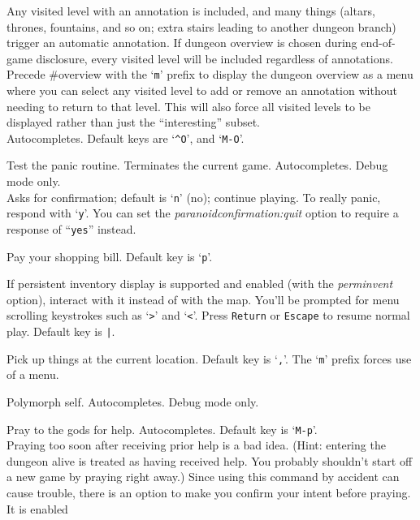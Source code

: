 \documentclass[titlepage]{article}
\begin{document}
\begin{description}[font=\mdseries\ttfamily]
Any visited level
with an annotation is included,
and many things (altars, thrones, fountains, and so on; extra stairs
leading to another dungeon branch) trigger an automatic annotation.
If dungeon overview is chosen during end-of-game disclosure, every visited
level will be included regardless of annotations.
\\
Precede \#overview with the `\texttt{m}' prefix to display the dungeon
overview as a menu where you can select any visited level to add or
remove an annotation without needing to return to that level.
This will also force all visited levels to be displayed rather than just
the ``interesting'' subset.
\\
Autocompletes.
Default keys are `\texttt{\textasciicircum O}', and `\texttt{M-O}'.
\item[\#panic]
Test the panic routine.
Terminates the current game.
Autocompletes.
Debug mode only.\\
Asks for confirmation; default is `\texttt{n}' (no); continue playing.
To really panic, respond with `\texttt{y}'.
You can set the
\textit{paranoid\textunderscore confirmation:quit}
option to require a response of ``\texttt{yes}'' instead.
\item[\#pay]
Pay your shopping bill. Default key is `\texttt{p}'.
\item[\#perminv]
If persistent inventory display is supported and enabled (with the
\textit{perm\textunderscore invent} option), interact with it instead of with the map.
You'll be prompted for menu scrolling keystrokes such
as `\texttt{>}' and `\texttt{<}'.
Press \texttt{Return} or \texttt{Escape} to resume normal play.
Default key is \texttt{|}.
\item[\#pickup]
Pick up things at the current location. Default key is `\texttt{,}'.
The `\texttt{m}' prefix forces use of a menu.
\item[\#polyself]
Polymorph self.
Autocompletes.
Debug mode only.
\item[\#pray]
Pray to the gods for help. Autocompletes. Default key is `\texttt{M-p}'.\\
Praying too soon after receiving prior help is a bad idea.
(Hint: entering the dungeon alive is treated as having received help.
You probably shouldn't start off a new game by praying right away.)
Since using this command by accident can cause trouble, there is an
option to make you confirm your intent before praying.  It is enabled

\end{description}
\end{document}
